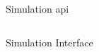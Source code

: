 
\begin{frame}{Simulation \acf{api}}

    \begin{columns}[T]
        \begin{column}{0.5\textwidth}

            \vspace{2cm}
        
            Simulation Interface
    
        \end{column}
        \begin{column}{0.5\textwidth}
        

            \begin{adjustbox}{scale=1,center,margin={0cm,3cm,2cm,0cm}}
                
            \end{adjustbox}
    
        \end{column}
    \end{columns}
    
\end{frame}

